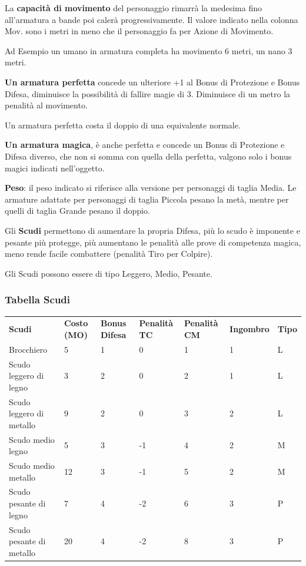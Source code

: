 \documentclass[a4paper,11pt,twoside,openany]{book}
\begin{document}
La \textbf{capacità di movimento} del personaggio rimarrà la medesima fino all'armatura a bande poi calerà progressivamente. Il valore indicato nella colonna Mov. sono i metri in meno che il personaggio fa per Azione di Movimento.

Ad Esempio un umano in armatura completa ha movimento 6 metri, un nano 3 metri.

\textbf{Un armatura perfetta} concede un ulteriore +1 al Bonus di Protezione e Bonus Difesa, diminuisce la possibilità di fallire magie di 3. Diminuisce di un metro la penalità al movimento.

Un armatura perfetta costa il doppio di una equivalente normale.

\textbf{Un armatura magica}, è anche perfetta e concede un Bonus di Protezione e Difesa diverso, che non si somma con quella della perfetta, valgono solo i bonus magici indicati nell'oggetto.

\textbf{Peso}: il peso indicato si riferisce alla versione per personaggi di taglia Media. Le armature adattate per personaggi di taglia Piccola pesano la metà, mentre per quelli di taglia Grande pesano il doppio.

\pagebreak

Gli \textbf{Scudi} permettono di aumentare la propria Difesa, più lo scudo è imponente e pesante più protegge, più aumentano le penalità alle prove di competenza magica, meno rende facile combattere (penalità Tiro per Colpire).

Gli Scudi possono essere di tipo Leggero, Medio, Pesante.

\subsubsection{Tabella Scudi}

\label{tabella-scudi}
\medskip
\begin{tabular}{lllllll}
	\toprule
	\textbf{Scudi} & \textbf{Costo (MO)} & \textbf{Bonus Difesa} & \textbf{Penalità TC} & \textbf{Penalità CM} & \textbf{Ingombro} & \textbf{Tipo}\\
	Brocchiero& 5    & 1 & 0& 1& 1  & L\\
	Scudo leggero di legno   & 3    & 2 & 0& 2& 1  & L\\
	Scudo leggero di metallo & 9    & 2 & 0& 3& 2  & L\\
	Scudo medio legno   & 5    & 3 & -1    & 4& 2  & M\\
	Scudo medio metallo & 12   & 3 & -1    & 5& 2  & M\\
	Scudo pesante di legno   & 7    & 4 & -2    & 6& 3  & P\\
	Scudo pesante di metallo & 20   & 4 & -2    & 8& 3  & P\\
\end{tabular}
\end{document}
